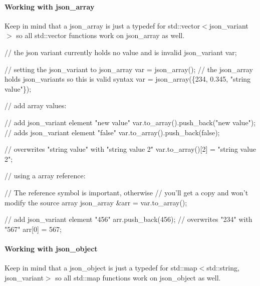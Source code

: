 \paragraph*{\label{_working_with_json_array_section}%
Working with json\+\_\+array}

Keep in mind that a {\ttfamily json\+\_\+array} is just a {\ttfamily typedef} for {\ttfamily std\+::vector$<$json\+\_\+variant$>$} so all {\ttfamily std\+::vector} functions work on {\ttfamily json\+\_\+array} as well.


\begin{DoxyCode}
\textcolor{comment}{// the json variant currently holds no value and is invalid}
json\_variant var;

\textcolor{comment}{// setting the json\_variant to json\_array}
var = json\_array();
\textcolor{comment}{// the json\_array holds json\_variants so this is valid syntax}
var = json\_array(\{234, 0.345, \textcolor{stringliteral}{"string value"}\});

\textcolor{comment}{// add array values:}

\textcolor{comment}{// add json\_variant element "new value"}
var.to\_array().push\_back(\textcolor{stringliteral}{"new value"});
\textcolor{comment}{// adds json\_variant element "false"}
var.to\_array().push\_back(\textcolor{keyword}{false});                

\textcolor{comment}{// overwrites "string value" with "string value 2"}
var.to\_array()[2] = \textcolor{stringliteral}{"string value 2"};           

\textcolor{comment}{// using a array reference:}

\textcolor{comment}{// The reference symbol is important, otherwise }
\textcolor{comment}{// you'll get a copy and won't modify the source array}
json\_array &arr = var.to\_array();

\textcolor{comment}{// add json\_variant element "456"}
arr.push\_back(456);
 \textcolor{comment}{// overwrites "234" with "567"}
arr[0] = 567;     
\end{DoxyCode}


\paragraph*{\label{_working_with_json_object_section}%
Working with json\+\_\+object}

Keep in mind that a {\ttfamily json\+\_\+object} is just a {\ttfamily typedef} for {\ttfamily std\+::map$<$std\+::string, json\+\_\+variant$>$} so all {\ttfamily std\+::map} functions work on {\ttfamily json\+\_\+object} as well.


